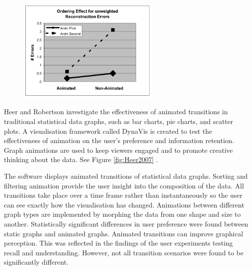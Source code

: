 \documentclass{egpubl}
\begin{document}
\begin{figure}
\begingroup
\centering
\includegraphics[width=7cm]{./images/bederson99does}
\label{fig:bederson99does}
\endgroup
\end{figure}


Heer and Robertson investigate the effectiveness of animated transitions in traditional statistical data graphs, such as bar charts, pie charts, and scatter plots. A visualisation framework called DynaVis is created to test the effectiveness of animation on the user's preference and information retention. Graph animations are used to keep viewers engaged and to promote creative thinking about the data. See Figure \ref{fig:Heer2007} \cite{heer2007}.

The software displays animated transitions of statistical data graphs. Sorting and filtering animation provide the user insight into the composition of the data. All transitions take place over a time frame rather than instantaneously so the user can see exactly how the visualisation has changed. Animations between different graph types are implemented by morphing the data from one shape and size to another.
Statistically significant differences in user preference were found between static graphs and animated graphs. Animated transitions can improve graphical perception. This was reflected in the findings of the user experiments testing recall and understanding. However, not all transition scenarios were found to be significantly different.
\end{document}
